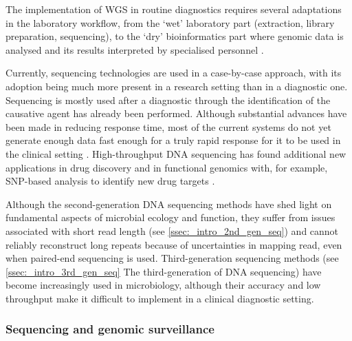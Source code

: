 The implementation of \ac{WGS} in routine diagnostics requires several adaptations in the laboratory workflow, from the ‘wet’ laboratory part (extraction, library preparation, sequencing), to the ‘dry’ bioinformatics part where genomic data is analysed and its results interpreted by specialised personnel \citep{rossen_practical_2018}. 

Currently, sequencing technologies are used in a case-by-case approach, with its adoption being much more present in a research setting than in a diagnostic one. 
Sequencing is mostly used after a diagnostic through the identification of the causative agent has already been performed. 
Although substantial advances have been made in reducing response time, most of the current systems do not yet generate enough data fast enough for a truly rapid response for it to be used in the clinical setting \citep{goodwin_coming_2016}. 
High-throughput \ac{DNA} sequencing has found additional new applications in drug discovery and in functional genomics with, for example, SNP-based analysis to identify new drug targets \citep{loman_twenty_2015}.

Although the second-generation \ac{DNA} sequencing methods have shed light on fundamental aspects of microbial ecology and function, they suffer from issues associated with short read length (see \ref{ssec:_intro_2nd_gen_seq}) and cannot reliably reconstruct long repeats because of uncertainties in mapping read, even when paired-end sequencing is used. 
Third-generation sequencing methods (see \ref{ssec:_intro_3rd_gen_seq} The third-generation of \ac{DNA} sequencing) have become increasingly used in microbiology, although their accuracy and low throughput make it difficult to implement in a clinical diagnostic setting. 

\subsubsection{Sequencing and genomic surveillance} \label{sssec:_intro_sequencing_genomic_survaillance}

